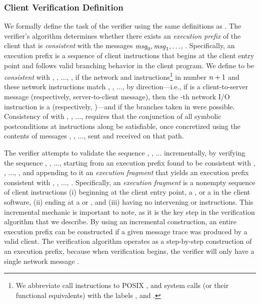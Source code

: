 \subsubsection{Client Verification Definition}
\label{sec:par:definitions}

We formally define the task of the verifier using the same definitions
as . The verifier's algorithm determines whether
there exists an \textit{execution prefix} of the client that is
\textit{consistent} with the messages $\mathit{msg}_{0}, \mathit{msg}_{1}, \ldots$,
\msg{\msgNmbr}.  Specifically, an execution prefix
\execPrefix{\msgNmbr} is a sequence of client instructions that begins
at the client entry point and follows valid branching behavior in the
client program. We define \execPrefix{\msgNmbr} to be
\textit{consistent} with , , $\ldots$, \msg{\msgNmbr},
if the network \sendInstr and \recvInstr instructions\footnote{We
abbreviate call instructions to POSIX \posixSelect, \posixSend and
\posixRecv system calls (or their functional equivalents) with the
labels \selInstr, \sendInstr and \recvInstr.} in \execPrefix{\msgNmbr}
number $n+1$ and  these network instructions match ,
, $\ldots$, \msg{\msgNmbr} by direction---i.e., if
\msg{\msgIdx} is a client-to-server message (respectively,
server-to-client message), then the \msgIdx-th network I/O instruction
is a \sendInstr (respectively, \recvInstr)---and if the branches taken
in \execPrefix{\msgNmbr} were possible. Consistency of
\execPrefix{\msgNmbr} with , , $\ldots$, \msg{\msgNmbr}
requires that the conjunction of all symbolic postconditions at
\sendInstr instructions along \execPrefix{\msgNmbr} be satisfiable,
once concretized using the contents of messages , ,
$\ldots$, \msg{\msgIdx} sent and received on that path. 

The verifier attempts to validate the sequence , ,
$\ldots$ incrementally, by verifying the sequence ,
, $\ldots$, \msg{\msgNmbr} starting from an execution prefix
 found to be consistent with , ,
$\ldots$, , and appending to it an \textit{execution
fragment} that yields an execution prefix \execPrefix{\msgNmbr}
consistent with , , $\ldots$, \msg{\msgNmbr}.
Specifically, an \textit{execution fragment} is a nonempty sequence of
client instructions (i) beginning at the client entry point, a
\selInstr, or a \sendInstr in the client software, (ii) ending at a
\sendInstr or \recvInstr, and (iii) having no intervening \sendInstr
or \recvInstr instructions.  This incremental mechanic is important to
note, as it is the key step in the verification algorithm that we
describe. By using an incremental construction, an entire execution
prefix \execPrefix{\msgNmbr} can be constructed if a given message
trace was produced by a valid client. The verification algorithm
operates as a step-by-step construction of an execution prefix,
because when verification begins, the verifier will only have a single
network message .

